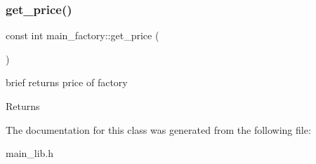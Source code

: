 \mbox{\label{classmain__factory_a91e3f57878aaa7b52d9ae4bcfbd84271}} 
\subsubsection{\texorpdfstring{get\+\_\+price()}{get\_price()}}
{\footnotesize\ttfamily const int main\+\_\+factory\+::get\+\_\+price (\begin{DoxyParamCaption}{ }\end{DoxyParamCaption})\hspace{0.3cm}{\ttfamily [inline]}}

brief returns price of factory \begin{DoxyReturn}{Returns}

\end{DoxyReturn}


The documentation for this class was generated from the following file\+:\begin{DoxyCompactItemize}
\item 
main\+\_\+lib.\+h\end{DoxyCompactItemize}
